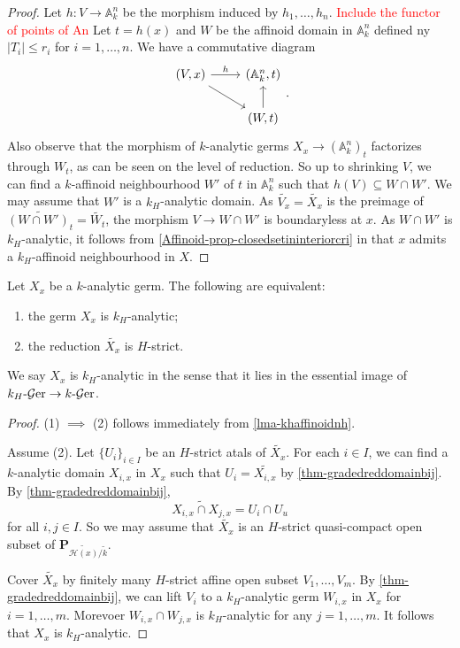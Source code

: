 \begin{proof}
    Let $h:V\rightarrow \mathbb{A}_k^{n}$ be the morphism induced by $h_1,\ldots,h_n$. \textcolor{red}{Include the functor of points of An}
    Let $t=h(x)$ and $W$ be the affinoid domain in $\mathbb{A}_k^{n}$ defined ny $|T_i|\leq r_i$ for $i=1,\ldots,n$. We have a commutative diagram
    \[
        \begin{tikzcd}
            {(V,x)} \arrow[r, "h"] \arrow[rd] & {(\mathbb{A}_k^n,t)} \\
                                              & {(W,t)} \arrow[u]   
        \end{tikzcd}.  
    \]
    Also observe that the morphism of $k$-analytic germs $X_x\rightarrow (\mathbb{A}_k^n)_t$ factorizes through $W_t$, as can be seen on the level of reduction. So up to shrinking $V$, we can find a $k$-affinoid neighbourhood $W'$ of $t$ in $\mathbb{A}_k^n$ such that $h(V)\subseteq W\cap W'$. We may assume that $W'$ is a $k_H$-analytic domain. As $\widetilde{V_x}=\widetilde{X_x}$ is the preimage of $\widetilde{(W\cap W')_t}=\widetilde{W_t}$, the morphism $V\rightarrow W\cap W'$ is boundaryless at $x$. As $W\cap W'$ is $k_H$-analytic, it follows from \cref{Affinoid-prop-closedsetininteriorcri} in  that $x$ admits a $k_H$-affinoid neighbourhood in $X$.
\end{proof}

\begin{corollary}\label{cor-germstrictiffredstrict}
    Let $X_x$ be a $k$-analytic germ. The following are equivalent:
    \begin{enumerate}
        \item the germ $X_x$ is $k_H$-analytic;
        \item the reduction $\widetilde{X_x}$ is $H$-strict.
    \end{enumerate}
\end{corollary}
We say $X_x$ is $k_H$-analytic in the sense that it lies in the essential image of $k_H\text{-}\mathcal{G}\mathrm{er}\rightarrow k\text{-}\mathcal{G}\mathrm{er}$.
\begin{proof}
    (1) $\implies$ (2) follows immediately from \cref{lma-khaffinoidnh}.

    Assume (2). Let $\{U_i\}_{i\in I}$ be an $H$-strict atals of $\widetilde{X_x}$. For each $i\in I$, we can find a $k$-analytic domain $X_{i,x}$ in $X_x$ such that $U_i=\widetilde{X_{i,x}}$ by \cref{thm-gradedreddomainbij}. By \cref{thm-gradedreddomainbij}, 
    \[
        \widetilde{X_{i,x}\cap X_{j,x}}=U_i\cap U_u
    \]
    for all $i,j\in I$. So we may assume that $\widetilde{X_x}$ is an $H$-strict quasi-compact open subset of $\mathbf{P}_{\widetilde{\mathscr{H}(x)}/\tilde{k}}$.

    Cover $\widetilde{X_x}$ by finitely many $H$-strict affine open subset $V_1,\ldots,V_m$.  By \cref{thm-gradedreddomainbij}, we can lift $V_i$ to a $k_H$-analytic germ $W_{i,x}$ in $X_x$ for $i=1,\ldots,m$. Morevoer $W_{i,x}\cap W_{j,x}$ is $k_H$-analytic for any $j=1,\ldots,m$. It follows that $X_x$ is $k_H$-analytic.
\end{proof}


